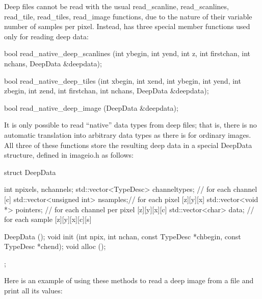 Deep files cannot be read with the usual {\cf read_scanline}, {\cf
  read_scanlines}, {\cf read_tile}, {\cf read_tiles}, {\cf read_image}
functions, due to the nature of their variable number of samples per
pixel.  Instead, \ImageInput has three special member functions used
only for reading deep data:

\begin{code}
    bool read_native_deep_scanlines (int ybegin, int yend, int z,
                                     int firstchan, int nchans,
                                     DeepData &deepdata);

    bool read_native_deep_tiles (int xbegin, int xend, int ybegin, int yend,
                                 int zbegin, int zend,
                                 int firstchan, int nchans, DeepData &deepdata);

    bool read_native_deep_image (DeepData &deepdata);
\end{code}

It is only possible to read ``native'' data types from deep files; that
is, there is no automatic translation into arbitrary data types as there
is for ordinary images.  All three of these functions store the
resulting deep data in a special {\cf DeepData} structure, defined in
{\cf imageio.h} as follows:

\begin{code}
    struct DeepData {
        int npixels, nchannels;
        std::vector<TypeDesc> channeltypes;  // for each channel [c]
        std::vector<unsigned int> nsamples;// for each pixel [z][y][x]
        std::vector<void *> pointers;    // for each channel per pixel [z][y][x][c]
        std::vector<char> data;          // for each sample [z][y][x][c][s]

        DeepData ();
        void init (int npix, int nchan,
                   const TypeDesc *chbegin, const TypeDesc *chend);
        void alloc ();
    };
\end{code}

Here is an example of using these methods to read a deep image from 
a file and print all its values:

